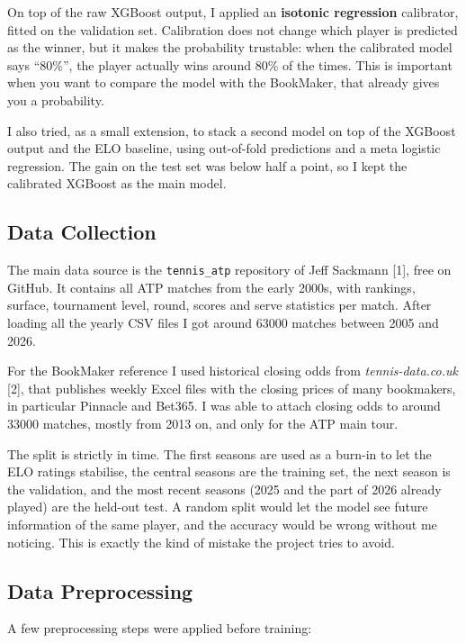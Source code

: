 \documentclass[10pt,twocolumn]{article}
\begin{document}
On top of the raw XGBoost output, I applied an \textbf{isotonic regression}
calibrator, fitted on the validation set. Calibration does not change
which player is predicted as the winner, but it makes the probability
trustable: when the calibrated model says ``80\%'', the player actually
wins around 80\% of the times. This is important when you want to compare
the model with the BookMaker, that already gives you a probability.

I also tried, as a small extension, to stack a second model on top of the
XGBoost output and the ELO baseline, using out-of-fold predictions and a
meta logistic regression. The gain on the test set was below half a
point, so I kept the calibrated XGBoost as the main model.

\subsection{Data Collection}
The main data source is the \texttt{tennis\_atp} repository of Jeff
Sackmann [1], free on GitHub. It contains all ATP matches from the early
2000s, with rankings, surface, tournament level, round, scores and serve
statistics per match. After loading all the yearly CSV files I got around
\num{63000} matches between 2005 and 2026.

For the BookMaker reference I used historical closing odds from
\textit{tennis-data.co.uk} [2], that publishes weekly Excel files with the
closing prices of many bookmakers, in particular Pinnacle and Bet365. I
was able to attach closing odds to around \num{33000} matches, mostly
from 2013 on, and only for the ATP main tour.

The split is strictly in time. The first seasons are used as a burn-in to
let the ELO ratings stabilise, the central seasons are the training set,
the next season is the validation, and the most recent seasons (2025 and
the part of 2026 already played) are the held-out test. A random split
would let the model see future information of the same player, and the
accuracy would be wrong without me noticing. This is exactly the kind of
mistake the project tries to avoid.

\subsection{Data Preprocessing}
A few preprocessing steps were applied before training:
\end{document}

